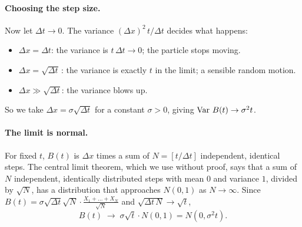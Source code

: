 \paragraph{Choosing the step size.} Now let $\Delta t\to0$. The variance $(\Delta x)^2\,t/\Delta t$ decides what happens:
\begin{itemize}
  \item $\Delta x=\Delta t$: the variance is $t\,\Delta t\to0$; the particle stops moving.
  \item $\Delta x=\sqrt{\Delta t}$\,: the variance is exactly $t$ in the limit; a sensible random motion.
  \item $\Delta x\gg\sqrt{\Delta t}$: the variance blows up.
\end{itemize}
So we take $\Delta x=\sigma\sqrt{\Delta t}$ for a constant $\sigma>0$, giving $\operatorname{Var}\,B(t)\to\sigma^2t$.

\begin{pic}
\end{pic}

\paragraph{The limit is normal.} For fixed $t$, $B(t)$ is $\Delta x$ times a sum of $N=[t/\Delta t]$ independent, identical steps. The central limit theorem, which we use without proof, says that a sum of $N$ independent, identically distributed steps with mean $0$ and variance $1$, divided by $\sqrt N$, has a distribution that approaches $N(0,1)$ as $N\to\infty$. Since $B(t)=\sigma\sqrt{\Delta t}\sqrt N\cdot\frac{X_1+\dots+X_N}{\sqrt N}$ and $\sqrt{\Delta t\,N}\to\sqrt t$,
\[
  B(t)\;\longrightarrow\;\sigma\sqrt t\cdot N(0,1)=N(0,\sigma^2t).
\]

